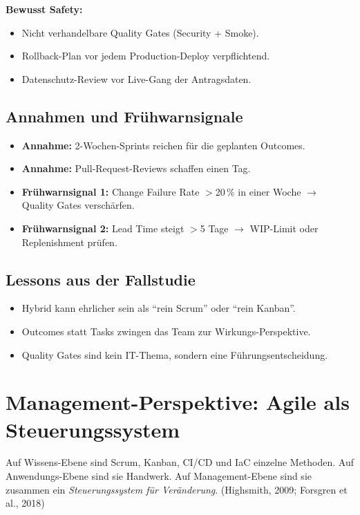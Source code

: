 \documentclass[11pt,a4paper,oneside]{article}
\newcommand{\quelle}[1]{{\footnotesize\color{lpGray}(#1)}}
\begin{document}
\textbf{Bewusst Safety:}
\begin{itemize}
  \item Nicht verhandelbare Quality Gates (Security + Smoke).
  \item Rollback-Plan vor jedem Production-Deploy verpflichtend.
  \item Datenschutz-Review vor Live-Gang der Antragsdaten.
\end{itemize}

\subsection{Annahmen und Frühwarnsignale}

\begin{itemize}
  \item \textbf{Annahme:} 2-Wochen-Sprints reichen für die geplanten Outcomes.
  \item \textbf{Annahme:} Pull-Request-Reviews schaffen einen Tag.
  \item \textbf{Frühwarnsignal 1:} Change Failure Rate $>$20\,\% in einer Woche $\rightarrow$ Quality Gates verschärfen.
  \item \textbf{Frühwarnsignal 2:} Lead Time steigt $>$5 Tage $\rightarrow$ WIP-Limit oder Replenishment prüfen.
\end{itemize}

\subsection{Lessons aus der Fallstudie}

\begin{itemize}
  \item Hybrid kann ehrlicher sein als ``rein Scrum'' oder ``rein Kanban''.
  \item Outcomes statt Tasks zwingen das Team zur Wirkungs-Perspektive.
  \item Quality Gates sind kein IT-Thema, sondern eine Führungsentscheidung.
\end{itemize}

\section{Management-Perspektive: Agile als Steuerungssystem}

Auf Wissens-Ebene sind Scrum, Kanban, CI/CD und IaC einzelne Methoden. Auf Anwendungs-Ebene sind sie Handwerk. Auf Management-Ebene sind sie zusammen ein \emph{Steuerungssystem für Veränderung}. \quelle{Highsmith, 2009; Forsgren et al., 2018}
\end{document}
